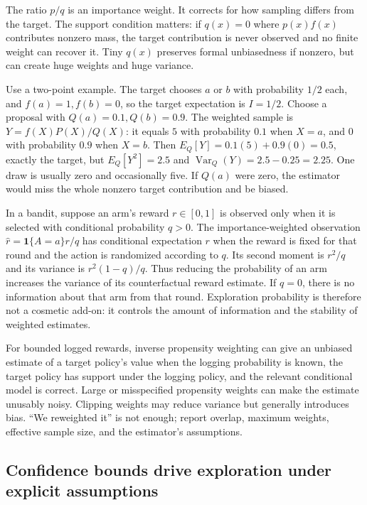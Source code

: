 The ratio \(p/q\) is an importance weight. It corrects for how sampling differs from the target. The support condition matters: if \(q(x)=0\) where \(p(x)f(x)\) contributes nonzero mass, the target contribution is never observed and no finite weight can recover it. Tiny \(q(x)\) preserves formal unbiasedness if nonzero, but can create huge weights and huge variance.

Use a two-point example. The target chooses \(a\) or \(b\) with probability \(1/2\) each, and \(f(a)=1,f(b)=0\), so the target expectation is \(I=1/2\). Choose a proposal with \(Q(a)=0.1,Q(b)=0.9\). The weighted sample is \(Y=f(X)P(X)/Q(X)\): it equals \(5\) with probability \(0.1\) when \(X=a\), and \(0\) with probability \(0.9\) when \(X=b\). Then \(E_Q[Y]=0.1(5)+0.9(0)=0.5\), exactly the target, but \(E_Q[Y^2]=2.5\) and \(\operatorname{Var}_Q(Y)=2.5-0.25=2.25\). One draw is usually zero and occasionally five. If \(Q(a)\) were zero, the estimator would miss the whole nonzero target contribution and be biased.

In a bandit, suppose an arm's reward \(r\in[0,1]\) is observed only when it is selected with conditional probability \(q>0\). The importance-weighted observation \(\hat r=\mathbf 1\{A=a\}r/q\) has conditional expectation \(r\) when the reward is fixed for that round and the action is randomized according to \(q\). Its second moment is \(r^2/q\) and its variance is \(r^2(1-q)/q\). Thus reducing the probability of an arm increases the variance of its counterfactual reward estimate. If \(q=0\), there is no information about that arm from that round. Exploration probability is therefore not a cosmetic add-on: it controls the amount of information and the stability of weighted estimates.

For bounded logged rewards, inverse propensity weighting can give an unbiased estimate of a target policy's value when the logging probability is known, the target policy has support under the logging policy, and the relevant conditional model is correct. Large or misspecified propensity weights can make the estimate unusably noisy. Clipping weights may reduce variance but generally introduces bias. ``We reweighted it'' is not enough; report overlap, maximum weights, effective sample size, and the estimator's assumptions.

\subsection{Confidence bounds drive exploration under explicit assumptions}\label{03-visual-computing-i-ch012-confidence-bounds-drive-exploration-under-explicit-assumptions}

